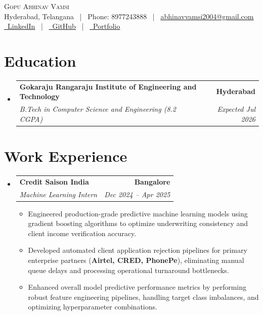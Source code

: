 \documentclass[letterpaper,10pt]{article}
\makeatletter
\newcommand{\resumeItem}[1]{
  \item\small{
    {#1 \vspace{-3pt}}
  }
}
\newcommand{\resumeSubheading}[4]{
  \vspace{-3pt}\item
    \begin{tabular*}{1.0\textwidth}[t]{l@{\extracolsep{\fill}}r}
      \textbf{#1} & \textbf{\small #2} \\
      \textit{\small#3} & \textit{\small #4} \\
    \end{tabular*}\vspace{-7pt}
}
\newcommand{\resumeSubHeadingListStart}{\begin{itemize}[leftmargin=0.0in, label={}]}
\newcommand{\resumeSubHeadingListEnd}{\end{itemize}}
\newcommand{\resumeItemListStart}{\begin{itemize}}
\newcommand{\resumeItemListEnd}{\end{itemize}\vspace{0pt}}
\makeatother
\begin{document}
    \begin{center}
        {\Huge\scshape Gopu Abhinav Vamsi} \\ \vspace{2pt}
        Hyderabad, Telangana ~|~ Phone: 8977243888 ~|~ \href{mailto:abhinavvamsi2004@gmail.com}{\underline{abhinavvamsi2004@gmail.com}} \\ \vspace{2pt}
        \small
        \href{https://www.linkedin.com/in/gopu-abhinav-vamsi-0211ab294/}{\faLinkedin\ \underline{LinkedIn}} ~|~
        \href{https://github.com/Abhinavvamsi}{\faGithub\ \underline{GitHub}} ~|~
        \href{https://abhinavvamsi.github.io/abhinav-portfolio/}{\faGlobe\ \underline{Portfolio}}
    \end{center}

\section{Education}
  \resumeSubHeadingListStart
    \resumeSubheading
      {Gokaraju Rangaraju Institute of Engineering and Technology}{Hyderabad}
      {B.Tech in Computer Science and Engineering (8.2 CGPA)}{Expected Jul 2026}
  \resumeSubHeadingListEnd

\section{Work Experience}
  \resumeSubHeadingListStart
    \resumeSubheading
      {Credit Saison India}{Bangalore}
      {Machine Learning Intern}{Dec 2024 -- Apr 2025}
      \resumeItemListStart
        \resumeItem{Engineered production-grade predictive machine learning models using gradient boosting algorithms to optimize underwriting consistency and client income verification accuracy.}
        \resumeItem{Developed automated client application rejection pipelines for primary enterprise partners (\textbf{Airtel, CRED, PhonePe}), eliminating manual queue delays and processing operational turnaround bottlenecks.}
        \resumeItem{Enhanced overall model predictive performance metrics by performing robust feature engineering pipelines, handling target class imbalances, and optimizing hyperparameter combinations.}
      \resumeItemListEnd
  \resumeSubHeadingListEnd

\end{document}
